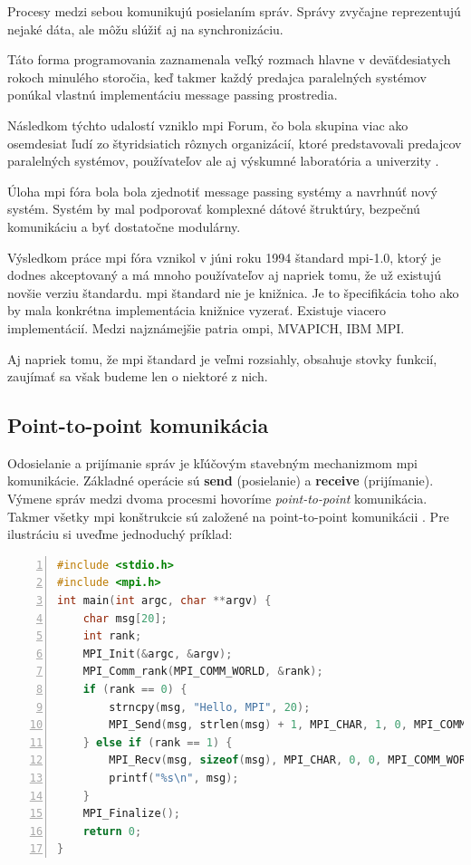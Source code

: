 Procesy medzi sebou komunikujú posielaním správ.
Správy zvyčajne reprezentujú nejaké dáta, ale môžu slúžiť aj na synchronizáciu.

Táto forma programovania zaznamenala veľký rozmach hlavne v deväťdesiatych rokoch minulého storočia,
keď takmer každý predajca paralelných systémov ponúkal vlastnú implementáciu message passing prostredia.

Následkom týchto udalostí vzniklo \acrfull{mpi} Forum, čo bola skupina viac ako osemdesiat ľudí zo štyridsiatich rôznych organizácií,
ktoré predstavovali predajcov paralelných systémov, používateľov ale aj výskumné laboratória a univerzity \cite{mpibook}.

Úloha \acrshort{mpi} fóra bola bola zjednotiť message passing systémy a navrhnúť nový systém.
Systém by mal podporovať komplexné dátové štruktúry, bezpečnú komunikáciu a byť dostatočne modulárny.

Výsledkom práce \acrshort{mpi} fóra vznikol v júni roku 1994 štandard \acrshort{mpi}-1.0,
ktorý je dodnes akceptovaný a má mnoho používateľov aj napriek tomu, že už existujú novšie verziu štandardu.
\acrshort{mpi} štandard nie je knižnica. Je to špecifikácia toho ako by mala konkrétna implementácia knižnice vyzerať.
Existuje viacero implementácií. Medzi najznámejšie patria \acrshort{ompi}, MVAPICH, IBM MPI.

Aj napriek tomu, že \acrshort{mpi} štandard je veľmi rozsiahly, obsahuje stovky funkcií, zaujímať sa však budeme len o niektoré z nich.

\subsection{Point-to-point komunikácia}
Odosielanie a prijímanie správ je kľúčovým stavebným mechanizmom \acrshort{mpi} komunikácie.
Základné operácie sú \textbf{send} (posielanie) a \textbf{receive} (prijímanie).
Výmene správ medzi dvoma procesmi hovoríme \textit{point-to-point} komunikácia.
Takmer všetky \acrshort{mpi} konštrukcie sú založené na point-to-point komunikácii \cite{mpi3-1}.
Pre ilustráciu si uveďme jednoduchý príklad:

\begin{lstlisting}[language=c, caption={Point-to-point komunikácia}, label={mpi:1}, numbers=left]
#include <stdio.h>
#include <mpi.h>
int main(int argc, char **argv) {
    char msg[20];
    int rank;
    MPI_Init(&argc, &argv);
    MPI_Comm_rank(MPI_COMM_WORLD, &rank);
    if (rank == 0) {
        strncpy(msg, "Hello, MPI", 20);
        MPI_Send(msg, strlen(msg) + 1, MPI_CHAR, 1, 0, MPI_COMM_WORLD);
    } else if (rank == 1) {
        MPI_Recv(msg, sizeof(msg), MPI_CHAR, 0, 0, MPI_COMM_WORLD, MPI_STATUS_IGNORE);
        printf("%s\n", msg);
    }
    MPI_Finalize();
    return 0;
}
\end{lstlisting}

